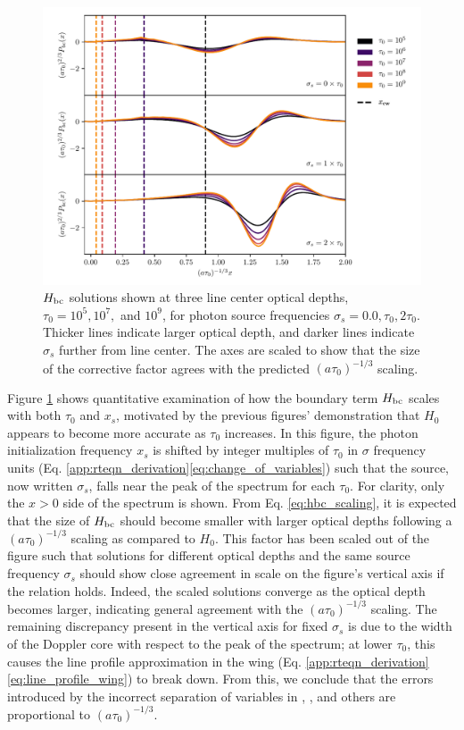 \documentclass{aastex63}
\begin{document}
\begin{figure}
    \centering
    \includegraphics[width=\textwidth]{xinit.pdf}
    \caption{$H_{\rm bc}$ solutions shown at three line center optical depths, $\tau_0=10^5, 10^7,$ and $10^9$, for photon source frequencies $\sigma_s=0.0, \tau_0, 2\tau_0$. Thicker lines indicate larger optical depth, and darker lines indicate $\sigma_s$ further from line center. The axes are scaled to show that the size of the corrective factor agrees with the predicted $(a\tau_0)^{-1/3}$ scaling.}
    \label{fig:xinit}
\end{figure}

Figure \ref{fig:xinit} shows quantitative examination of how the boundary term $H_{\rm bc}$ scales with both $\tau_0$ and $x_s$, motivated by the previous figures' demonstration that $H_0$ appears to become more accurate as $\tau_0$ increases. In this figure, the photon initialization frequency $x_s$ is shifted by integer multiples of $\tau_0$ in $\sigma$ frequency units (Eq. \ref{app:rteqn_derivation}\ref{eq:change_of_variables}) such that the source, now written $\sigma_s$, falls near the peak of the spectrum for each $\tau_0$. For clarity, only the $x > 0$ side of the spectrum is shown. From Eq. \ref{eq:hbc_scaling}, it is expected that the size of $H_{\rm bc}$ should become smaller with larger optical depths following a $(a\tau_0)^{-1/3}$ scaling as compared to $H_0$. This factor has been scaled out of the figure such that solutions for different optical depths and the same source frequency $\sigma_s$ should show close agreement in scale on the figure's vertical axis if the relation holds. Indeed, the scaled solutions converge as the optical depth becomes larger, indicating general agreement with the $(a\tau_0)^{-1/3}$ scaling. The remaining discrepancy present in the vertical axis for fixed $\sigma_s$ is due to the width of the Doppler core with respect to the peak of the spectrum; at lower $\tau_0$, this causes the line profile approximation in the wing (Eq. \ref{app:rteqn_derivation}\ref{eq:line_profile_wing}) to break down. From this, we conclude that the errors introduced by the incorrect separation of variables in \cite{1973MNRAS.162...43H}, \cite{1990ApJ...350..216N}, \cite{2006ApJ...649...14D} and others are proportional to $(a\tau_0)^{-1/3}$.
\end{document}
